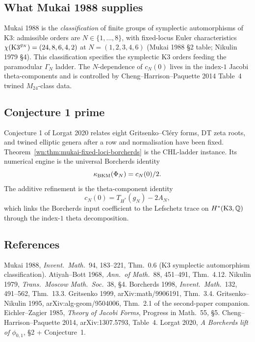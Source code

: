\subsection*{What Mukai 1988 supplies}

Mukai 1988 is the \emph{classification} of finite groups of symplectic
automorphisms of K3: admissible orders are $N \in \{1,\ldots,8\}$, with
fixed-locus Euler characteristics
$\chi(\mathrm{K3}^{g_N}) = (24, 8, 6, 4, 2)$ at $N = (1,2,3,4,6)$
(Mukai 1988 \S2 table; Nikulin 1979 \S4). This classification specifies
the symplectic K3 orders feeding the paramodular $\Gamma_N$ ladder.
The \(N\)-dependence of \(c_N(0)\) lives in the index-\(1\) Jacobi
theta-components and is controlled by Cheng--Harrison--Paquette 2014
Table~4 twined \(M_{24}\)-class data.

\subsection*{Conjecture 1 prime}

Conjecture 1 of Lorgat 2020 relates eight Gritsenko--Cl\'ery forms, DT
zeta roots, and twined elliptic genera after a row and normalisation
have been fixed.  Theorem~\ref{wn:thm:mukai-fixed-loci-borcherds} is
the CHL-ladder instance.  Its numerical engine is the universal
Borcherds identity
\[
  \kappa_{\mathrm{BKM}}(\Phi_N)=c_N(0)/2.
\]
The additive refinement is the theta-component identity
\[
  c_N(0)=T_{H^*}(g_N)-2A_N,
\]
which links the Borcherds input coefficient to the Lefschetz trace on
\(H^*(\mathrm{K3},\mathbb Q)\) through the index-\(1\) theta decomposition.

\subsection*{References}

Mukai 1988, \emph{Invent.\ Math.}~94, 183--221, Thm.~0.6 (K3 symplectic
automorphism classification).
Atiyah--Bott 1968, \emph{Ann.\ of Math.}~88, 451--491, Thm.~4.12.
Nikulin 1979, \emph{Trans.\ Moscow Math.\ Soc.}~38, \S4.
Borcherds 1998, \emph{Invent.\ Math.}~132, 491--562, Thm.~13.3.
Gritsenko 1999, arXiv:math/9906191, Thm.~3.4.
Gritsenko--Nikulin 1995, arXiv:alg-geom/9504006, Thm.~2.1 of the second-paper companion.
Eichler--Zagier 1985, \emph{Theory of Jacobi Forms}, Progress in
Math.~55, \S5.
Cheng--Harrison--Paquette 2014, arXiv:1307.5793, Table~4.
Lorgat 2020, \emph{A Borcherds lift of $\phi_{0,1}$}, \S2 + Conjecture~1.
